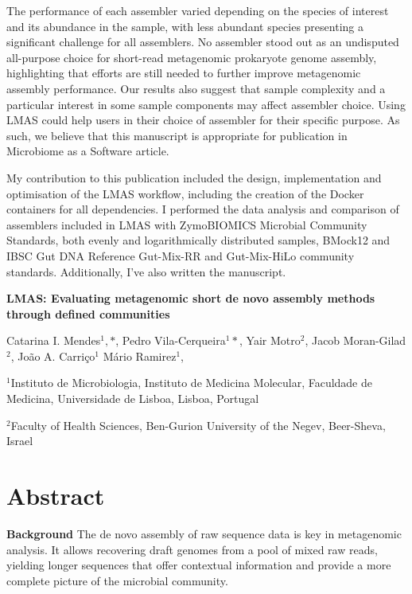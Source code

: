 The performance of each assembler varied depending on the species of interest and its abundance in the sample, with less abundant species presenting a significant challenge for all assemblers. No assembler stood out as an undisputed all-purpose choice for short-read metagenomic prokaryote genome assembly, highlighting that efforts are still needed to further improve metagenomic assembly performance. Our results also suggest that sample complexity and a particular interest in some sample components may affect assembler choice. Using LMAS could help users in their choice of assembler for their specific purpose.  As such, we believe that this manuscript is appropriate for publication in Microbiome as a Software article. 

My contribution to this publication included the design, implementation and optimisation of the LMAS workflow, including the creation of the Docker containers for all dependencies. I performed the data analysis and comparison of assemblers included in LMAS with ZymoBIOMICS Microbial Community Standards, both evenly and logarithmically distributed samples, BMock12 and IBSC Gut DNA Reference Gut-Mix-RR and Gut-Mix-HiLo community standards. Additionally, I've also written the manuscript.

\cleardoublepage 

\begin{center}
\large
\textbf{LMAS: Evaluating metagenomic short de novo assembly methods through defined communities}
\end{center}

Catarina I. Mendes$^1,*$, 
Pedro Vila-Cerqueira$^1*$,
Yair Motro$^2$,
Jacob Moran-Gilad$^2$,
João A. Carriço$^1$
Mário Ramirez$^1$, 


$^1$Instituto de Microbiologia, Instituto de Medicina Molecular, Faculdade de Medicina, Universidade de Lisboa, Lisboa, Portugal 

$^2$Faculty of Health Sciences, Ben-Gurion University of the Negev, Beer-Sheva, Israel

\section{Abstract}

\textbf{Background }The de novo assembly of raw sequence data is key in metagenomic analysis. It allows recovering draft genomes from a pool of mixed raw reads, yielding longer sequences that offer contextual information and provide a more complete picture of the microbial community.

